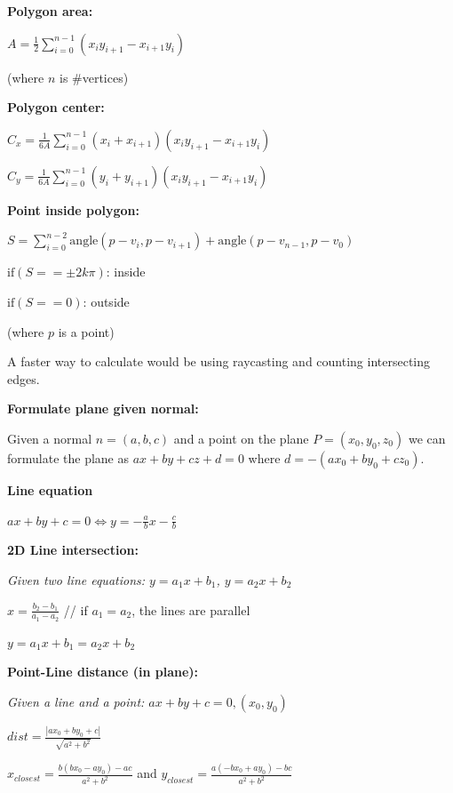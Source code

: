 \documentclass[8pt,a4paper,landscape,oneside]{amsart}
\begin{document}
\begin{multicols*}{3}
  \textbf{Polygon area:} 

  $A = \frac{1}{2}\sum\limits^{n-1}_{i=0}(x_iy_{i+1}-x_{i+1}y_i)$

  (where $n$ is \#vertices)
  \newline

  \textbf{Polygon center:}

  $C_x = \frac{1}{6A}\sum\limits^{n-1}_{i=0}(x_i+x_{i+1})(x_iy_{i+1}-x_{i+1}y_i)$

  $C_y = \frac{1}{6A}\sum\limits^{n-1}_{i=0}(y_i+y_{i+1})(x_iy_{i+1}-x_{i+1}y_i)$
  \newline

  \textbf{Point inside polygon:} 

  $S = \sum\limits^{n-2}_{i=0}\mathrm{angle}(p - v_i, p - v_{i+1}) + \mathrm{angle}(p - v_{n-1}, p - v_0)$

  $\mathrm{if} (S == \pm 2k\pi)$: inside

  $\mathrm{if} (S == 0)$: outside

  (where $p$ is a point)

  A faster way to calculate would be using raycasting and counting intersecting edges.
  \newline
  
  \textbf{Formulate plane given normal:}
  
  Given a normal $n=(a,b,c)$ and a point on the plane $P=(x_0,y_0,z_0)$ we can formulate the plane as $ax +by +cz + d = 0$ where $d = -(ax_0 + by_0 + cz_0)$.
  \newline
  
  \textbf{Line equation}

  $ax + by + c = 0 \Leftrightarrow y = -\frac{a}{b}x -\frac{c}{b}$
  \newline

  \textbf{2D Line intersection:} 

  \textit{Given two line equations: $y = a_1x + b_1$, $y = a_2x + b_2$}

  $x = \frac{b_2 - b_1}{a_1 - a_2}$ // if $a_1 = a_2$, the lines are parallel

  $y = a_1x + b_1 = a_2x + b_2$
  \newline

  \textbf{Point-Line distance (in plane):} 

  \textit{Given a line and a point: $ax+by+c=0, (x_0, y_0)$}

  $dist = \frac{|ax_0+by_0+c|}{\sqrt{a^2+b^2}}$

  $x_{closest}=\frac{b(bx_0-ay_0)-ac}{a^2+b^2}$ and $y_{closest}={\frac{a(-bx_0+ay_0)-bc}{a^2+b^2}}$
  \newline


\end{multicols*}
\end{document}

